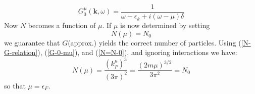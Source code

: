 \begin{equation}G_{0}^{\mu}(\mathbf{k}, \omega)=\frac{1}{\omega-\epsilon_{k}+i(\omega-\mu) \delta}
\label{G-0-mu}
\end{equation}
Now $N$ becomes a function of $\mu$. If $\mu$ is now determined by setting
\begin{equation}
N(\mu)=N_0
\label{N=N-0}
\end{equation}
we guarantee that $G$(approx.) yields the correct number of particles. Using (\ref{N-G-relation}), (\ref{G-0-mu}), and (\ref{N=N-0}), and ignoring interactions we have:
\begin{equation}N(\mu)=\frac{\left(k_{P}^{\mu}\right)^{3}}{(3 \pi)^{2}}=\frac{(2 m \mu)^{3/2}}{3 \pi^{2}}=N_{0}\end{equation}
so that $\mu=\epsilon_F$.